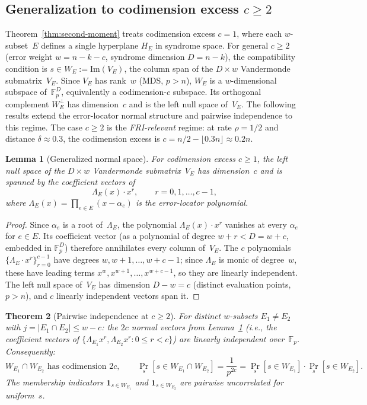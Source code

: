\documentclass[11pt]{article}
\newtheorem{theorem}{Theorem}
\newtheorem{lemma}[theorem]{Lemma}
\newcommand{\FF}{\mathbb{F}}
\begin{document}
\subsection{Generalization to codimension excess $c \geq 2$}
\label{sec:poisson-c2}

Theorem~\ref{thm:second-moment} treats codimension excess $c = 1$, where each $w$-subset~$E$ defines a single hyperplane $H_E$ in syndrome space. For general $c \geq 2$ (error weight $w = n-k-c$, syndrome dimension $D = n-k$), the compatibility condition is $s \in W_E := \mathrm{Im}(V_E)$, the column span of the $D \times w$ Vandermonde submatrix~$V_E$. Since $V_E$ has rank~$w$ (MDS, $p > n$), $W_E$ is a $w$-dimensional subspace of~$\FF_p^D$, equivalently a codimension-$c$ subspace. Its orthogonal complement $W_E^\perp$ has dimension~$c$ and is the left null space of~$V_E$. The following results extend the error-locator normal structure and pairwise independence to this regime. The case $c \geq 2$ is the \emph{FRI-relevant} regime: at rate $\rho = 1/2$ and distance $\delta \approx 0.3$, the codimension excess is $c = n/2 - \lfloor 0.3n\rfloor \approx 0.2n$.

\begin{lemma}[Generalized normal space]
\label{lem:locator-normal-c}
For codimension excess $c \geq 1$, the left null space of the $D \times w$ Vandermonde submatrix~$V_E$ has dimension~$c$ and is spanned by the coefficient vectors of
$$\Lambda_E(x) \cdot x^r, \qquad r = 0, 1, \ldots, c-1,$$
where $\Lambda_E(x) = \prod_{e \in E}(x - \alpha_e)$ is the error-locator polynomial.
\end{lemma}

\begin{proof}
Since $\alpha_e$ is a root of~$\Lambda_E$, the polynomial $\Lambda_E(x) \cdot x^r$ vanishes at every $\alpha_e$ for $e \in E$. Its coefficient vector (as a polynomial of degree $w + r < D = w + c$, embedded in $\FF_p^D$) therefore annihilates every column of~$V_E$. The $c$ polynomials $\{\Lambda_E \cdot x^r\}_{r=0}^{c-1}$ have degrees $w, w{+}1, \ldots, w{+}c{-}1$; since $\Lambda_E$ is monic of degree~$w$, these have leading terms $x^w, x^{w+1}, \ldots, x^{w+c-1}$, so they are linearly independent. The left null space of~$V_E$ has dimension $D - w = c$ (distinct evaluation points, $p > n$), and $c$ linearly independent vectors span it.
\end{proof}

\begin{theorem}[Pairwise independence at $c \geq 2$]
\label{thm:pairwise-c}
For distinct $w$-subsets $E_1 \neq E_2$ with $j = |E_1 \cap E_2| \leq w - c$: the $2c$ normal vectors from Lemma~\ref{lem:locator-normal-c} (i.e., the coefficient vectors of $\{\Lambda_{E_1} x^r, \Lambda_{E_2} x^r : 0 \leq r < c\}$) are linearly independent over~$\FF_p$. Consequently:
$$W_{E_1} \cap W_{E_2} \text{ has codimension } 2c, \qquad \Pr_s[s \in W_{E_1} \cap W_{E_2}] = \frac{1}{p^{2c}} = \Pr_s[s \in W_{E_1}] \cdot \Pr_s[s \in W_{E_2}].$$
The membership indicators $\mathbf{1}_{s \in W_{E_1}}$ and $\mathbf{1}_{s \in W_{E_2}}$ are pairwise uncorrelated for uniform~$s$.
\end{theorem}
\end{document}
